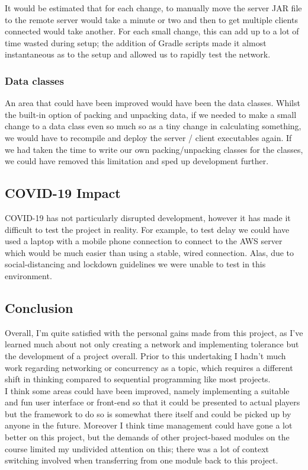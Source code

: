 \documentclass[11pt]{article}
\begin{document}
It would be estimated that for each change, to manually move the server JAR file to the remote server would take a minute or two and then to get multiple clients connected would take another. For each small change, this can add up to a lot of time wasted during setup; the addition of Gradle scripts made it almost instantaneous as to the setup and allowed us to rapidly test the network.

\subsubsection{Data classes}
An area that could have been improved would have been the data classes. Whilst the built-in option of packing and unpacking data, if we needed to make a small change to a data class even so much so as a tiny change in calculating something, we would have to recompile and deploy the server / client executables again. If we had taken the time to write our own packing/unpacking classes for the classes, we could have removed this limitation and sped up development further. 

\newpage

\subsection{COVID-19 Impact}
COVID-19 has not particularly disrupted development, however it has made it difficult to test the project in reality. For example, to test delay we could have used a laptop with a mobile phone connection to connect to the AWS server which would be much easier than using a stable, wired connection. Alas, due to social-distancing and lockdown guidelines we were unable to test in this environment.


\subsection{Conclusion}

Overall, I'm quite satisfied with the personal gains made from this project, as I've learned much about not only creating a network and implementing tolerance but the development of a project overall. Prior to this undertaking I hadn't much work regarding networking or concurrency as a topic, which requires a different shift in thinking compared to sequential programming like most projects. \\

I think some areas could have been improved, namely implementing a suitable and fun user interface or front-end so that it could be presented to actual players but the framework to do so is somewhat there itself and could be picked up by anyone in the future. Moreover I think time management could have gone a lot better on this project, but the demands of other project-based modules on the course limited my undivided attention on this; there was a lot of context switching involved when transferring from one module back to this project.  \\
\end{document}
